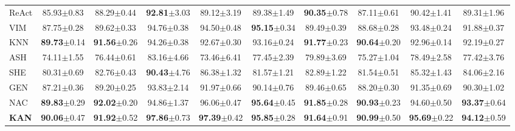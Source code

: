 \begin{table}[ht]
\begin{center}
{\begin{tabular}{lccccccccc}
ReAct & 85.93\scriptsize{$\pm$0.83} & 88.29\scriptsize{$\pm$0.44} & \textbf{92.81}\scriptsize{$\pm$3.03} & 89.12\scriptsize{$\pm$3.19} & 89.38\scriptsize{$\pm$1.49} & \textbf{90.35}\scriptsize{$\pm$0.78} & 87.11\scriptsize{$\pm$0.61} & 90.42\scriptsize{$\pm$1.41} & 89.31\scriptsize{$\pm$1.96} \\
VIM & 87.75\scriptsize{$\pm$0.28} & 89.62\scriptsize{$\pm$0.33} & 94.76\scriptsize{$\pm$0.38} & 94.50\scriptsize{$\pm$0.48} & \textbf{95.15}\scriptsize{$\pm$0.34} & 89.49\scriptsize{$\pm$0.39} & 88.68\scriptsize{$\pm$0.28} & 93.48\scriptsize{$\pm$0.24} & 91.88\scriptsize{$\pm$0.37} \\
KNN & \textbf{89.73}\scriptsize{$\pm$0.14} & \textbf{91.56}\scriptsize{$\pm$0.26} & 94.26\scriptsize{$\pm$0.38} & 92.67\scriptsize{$\pm$0.30} & 93.16\scriptsize{$\pm$0.24} & \textbf{91.77}\scriptsize{$\pm$0.23} & \textbf{90.64}\scriptsize{$\pm$0.20} & 92.96\scriptsize{$\pm$0.14} & 92.19\scriptsize{$\pm$0.27} \\
ASH & 74.11\scriptsize{$\pm$1.55} & 76.44\scriptsize{$\pm$0.61} & 83.16\scriptsize{$\pm$4.66} & 73.46\scriptsize{$\pm$6.41} & 77.45\scriptsize{$\pm$2.39} & 79.89\scriptsize{$\pm$3.69} & 75.27\scriptsize{$\pm$1.04} & 78.49\scriptsize{$\pm$2.58} & 77.42\scriptsize{$\pm$3.76} \\
SHE & 80.31\scriptsize{$\pm$0.69} & 82.76\scriptsize{$\pm$0.43} & \textbf{90.43}\scriptsize{$\pm$4.76} & 86.38\scriptsize{$\pm$1.32} & 81.57\scriptsize{$\pm$1.21} & 82.89\scriptsize{$\pm$1.22} & 81.54\scriptsize{$\pm$0.51} & 85.32\scriptsize{$\pm$1.43} & 84.06\scriptsize{$\pm$2.16} \\
GEN & 87.21\scriptsize{$\pm$0.36} & 89.20\scriptsize{$\pm$0.25} & 93.83\scriptsize{$\pm$2.14} & 91.97\scriptsize{$\pm$0.66} & 90.14\scriptsize{$\pm$0.76} & 89.46\scriptsize{$\pm$0.65} & 88.20\scriptsize{$\pm$0.30} & 91.35\scriptsize{$\pm$0.69} & 90.30\scriptsize{$\pm$1.02} \\
NAC & \textbf{89.83}\scriptsize{$\pm$0.29} & \textbf{92.02}\scriptsize{$\pm$0.20} & 94.86\scriptsize{$\pm$1.37} & 96.06\scriptsize{$\pm$0.47} & \textbf{95.64}\scriptsize{$\pm$0.45} & \textbf{91.85}\scriptsize{$\pm$0.28} & \textbf{90.93}\scriptsize{$\pm$0.23} & 94.60\scriptsize{$\pm$0.50} & \textbf{93.37}\scriptsize{$\pm$0.64} \\
\rowcolor[HTML]{E7E6E6}
\textbf{KAN} & \textbf{90.06}\scriptsize{$\pm$0.47} & \textbf{91.92}\scriptsize{$\pm$0.52} & \textbf{97.86}\scriptsize{$\pm$0.73} & \textbf{97.39}\scriptsize{$\pm$0.42} & \textbf{95.85}\scriptsize{$\pm$0.28} & \textbf{91.64}\scriptsize{$\pm$0.91} & \textbf{90.99}\scriptsize{$\pm$0.50} & \textbf{95.69}\scriptsize{$\pm$0.22} & \textbf{94.12}\scriptsize{$\pm$0.59} \\

\end{tabular}}
\end{center}
\end{table}
